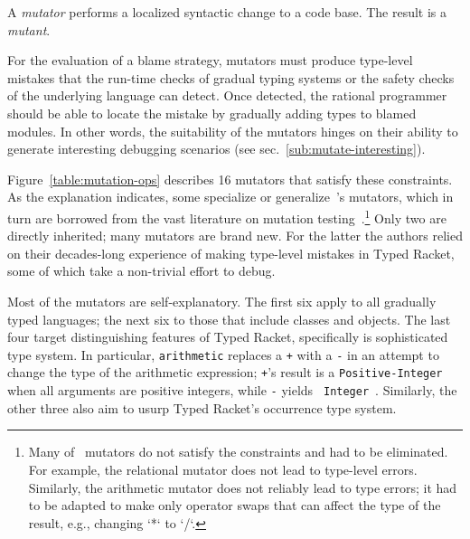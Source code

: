 
A {\it mutator\/} performs a localized syntactic change to a code base. The
result is a {\em mutant\/}.

For the evaluation of a blame strategy, mutators must produce type-level
mistakes that the run-time checks of gradual typing systems or the safety
checks of the underlying language can detect. Once detected, the rational
programmer should be able to locate the mistake by gradually adding types
to blamed modules. In other words, the suitability of the mutators hinges
on their ability to generate interesting debugging scenarios (see
sec.~\ref{sub:mutate-interesting}).


Figure~\ref{table:mutation-ops} describes 16 mutators that satisfy these
constraints. As the explanation indicates, some specialize or
generalize~\citet{lksfd-popl-2020}'s mutators, which in turn are borrowed from
the vast literature on mutation testing~\cite{jia2011analysis}.\footnote{Many
of~\citet{lksfd-popl-2020} mutators do not satisfy the constraints and had to
be eliminated. For example, the relational mutator does not lead to type-level
errors. Similarly, the arithmetic mutator does not reliably lead to type
errors; it had to be adapted to make only operator swaps that can affect the
type of the result, e.g., changing `*` to `/`.}  Only two are directly
inherited; many mutators are brand new. For the latter the authors relied on
their decades-long experience of making type-level mistakes in Typed Racket,
some of which take a non-trivial effort to debug. 

Most of the mutators are self-explanatory.  The first six apply to all
gradually typed languages; the next six to those that include classes and
objects. The last four target distinguishing features of Typed Racket,
specifically is sophisticated type system. In particular, {\tt arithmetic}
replaces a {\tt +} with a {\tt -} in an attempt to change the type of the
arithmetic expression; {\tt +}'s result is a {\tt Positive-Integer} when all
arguments are positive integers, while {\tt -} yields {\tt
Integer}~\cite{stathff-padl-12}. Similarly, the other three also aim to usurp
Typed Racket's occurrence type system. 
